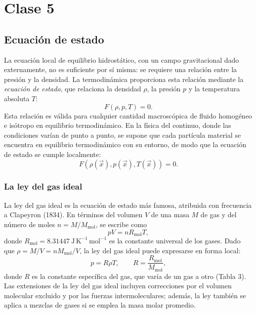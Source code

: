\shorthandoff{<>}





\shorthandon{<>}

\chapter{Clase 5}

\section{Ecuación de estado}

La ecuación local de equilibrio hidrostático, con un campo gravitacional dado externamente, no es suficiente por sí misma: se requiere una relación entre la presión y la densidad. La termodinámica proporciona esta relación mediante la \emph{ecuación de estado}, que relaciona la densidad $\rho$, la presión $p$ y la temperatura absoluta $T$:
$$ F(\rho, p, T) = 0. $$
Esta relación es válida para cualquier cantidad macroscópica de fluido homogéneo e isótropo en equilibrio termodinámico. En la física del continuo, donde las condiciones varían de punto a punto, se supone que cada partícula material se encuentra en equilibrio termodinámico con su entorno, de modo que la ecuación de estado se cumple localmente:
$$ F(\rho(\vec{x}), p(\vec{x}), T(\vec{x})) = 0. $$

\subsection{La ley del gas ideal}

La ley del gas ideal es la ecuación de estado más famosa, atribuida con frecuencia a Clapeyron (1834). En términos del volumen $V$ de una masa $M$ de gas y del número de moles $n = M/M_{\mathrm{mol}}$, se escribe como
$$ pV = nR_{\mathrm{mol}}T, $$
donde $R_{\mathrm{mol}} = 8.31447\ \mathrm{J\,K^{-1}\,mol^{-1}}$ es la constante universal de los gases. Dado que $\rho = M/V = nM_{\mathrm{mol}}/V$, la ley del gas ideal puede expresarse en forma local:
$$ p = R\rho T, \qquad R = \frac{R_{\mathrm{mol}}}{M_{\mathrm{mol}}}, $$
donde $R$ es la constante específica del gas, que varía de un gas a otro (Tabla 3). Las extensiones de la ley del gas ideal incluyen correcciones por el volumen molecular excluido y por las fuerzas intermoleculares; además, la ley también se aplica a mezclas de gases si se emplea la masa molar promedio.

